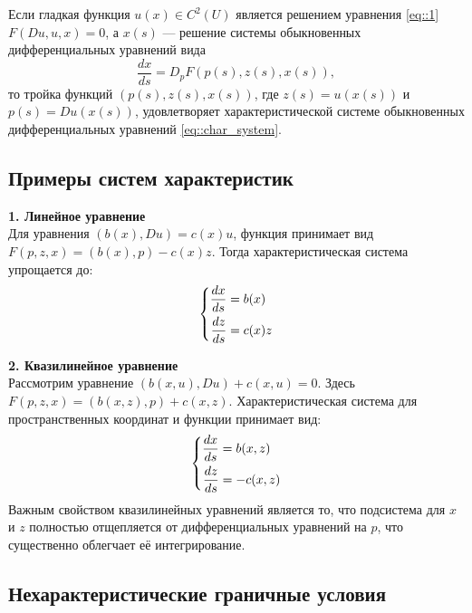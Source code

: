 \begin{theorem}
    Если гладкая функция $u(x) \in C^2(U)$ является решением уравнения 
    \eqref{eq::1} $F(Du, u, x) = 0$, 
    а $x(s)$ --- решение системы обыкновенных дифференциальных уравнений вида
    \begin{equation}
        \frac{dx}{ds} = D_p F(p(s), z(s), x(s)),
    \end{equation}
    то тройка функций $(p(s), z(s), x(s))$, где $z(s) = u(x(s))$ и $p(s) = Du(x(s))$, 
    удовлетворяет характеристической системе обыкновенных дифференциальных 
    уравнений \eqref{eq::char_system}.
\end{theorem}

\subsection{Примеры систем характеристик}

\textbf{1. Линейное уравнение}\\
Для уравнения $(b(x), Du) = c(x)u$, функция принимает вид $F(p, z, x) = (b(x), p) - c(x)z$. 
Тогда характеристическая система упрощается до:
\begin{equation}
    \left\{\begin{aligned}
        \frac{dx}{ds} &= b(x) \\
        \frac{dz}{ds} &= c(x)z
    \end{aligned}\right.
\end{equation}

\textbf{2. Квазилинейное уравнение}\\
Рассмотрим уравнение $(b(x, u), Du) + c(x, u) = 0$. 
Здесь $F(p, z, x) = (b(x, z), p) + c(x, z)$. Характеристическая система для пространственных координат и функции принимает вид:
\begin{equation}
    \left\{\begin{aligned}
        \frac{dx}{ds} &= b(x, z) \\
        \frac{dz}{ds} &= -c(x, z)
    \end{aligned}\right.
\end{equation}
Важным свойством квазилинейных уравнений является то, что подсистема для $x$ и $z$ полностью отщепляется от дифференциальных уравнений на $p$, что существенно облегчает её интегрирование.

\subsection{Нехарактеристические граничные условия}

